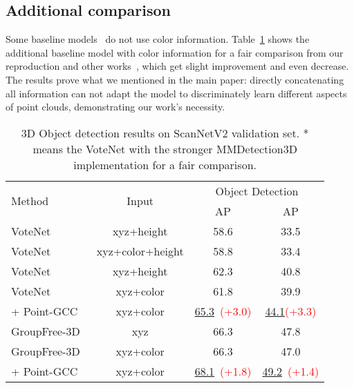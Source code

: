 \documentclass{article}
\begin{document}
\subsection{Additional comparison}\label{app:add_eva}
\vspace{-0.1cm}
Some baseline models~\cite{VoteNet, GroupFree} do not use color information. Table~\ref{tab:color-baseline} shows the additional baseline model with color information for a fair comparison from our reproduction and other works~\cite{Ponder,TokenFusion}, which get slight improvement and even decrease. The results prove what we mentioned in the main paper: directly concatenating all information can not adapt the model to discriminately learn different aspects of point clouds, demonstrating our work's necessity.
\begin{table}[h!]
\centering
{
\begin{tabular}{lccc}
    \toprule
    \multirow{2}{*}{Method} & \multirow{2}{*}{Input} & \multicolumn{2}{c}{Object Detection} \\
    \cmidrule(r){3-4}
    & & AP &  AP \\
    \midrule
    VoteNet~\cite{VoteNet} & xyz+height & 58.6 & 33.5 \\
    VoteNet~\cite{Ponder} & xyz+color+height & 58.8 & 33.4 \\
    VoteNet & xyz+height & 62.3 & 40.8 \\
    VoteNet & xyz+color & 61.8 & 39.9 \\
    \rowcolor{linecolor2}+ Point-GCC & xyz+color & \underline{65.3}~\tiny{\textcolor{red}{(+3.0)}} & \underline{44.1}\tiny{\textcolor{red}{(+3.3)}}  \\
    \midrule
    GroupFree-3D~\cite{GroupFree} & xyz & 66.3 & 47.8 \\
    GroupFree-3D~\cite{TokenFusion} & xyz+color & 66.3 & 47.0 \\
    \rowcolor{linecolor2}+ Point-GCC & xyz+color & \underline{68.1}~\tiny{\textcolor{red}{(+1.8)}} & \underline{49.2}~\tiny{\textcolor{red}{(+1.4)}} \\
    \bottomrule
\end{tabular}
}
\caption{3D Object detection results on ScanNetV2 validation set. * means the VoteNet with the stronger MMDetection3D implementation for a fair comparison.}
\label{tab:color-baseline}
\end{table}
\end{document}
